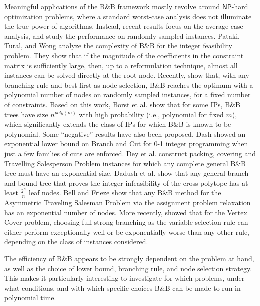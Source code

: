 \documentclass[moor,sglanonrev]{informs4}
\theoremstyle{plain}
\begin{document}
Meaningful applications of the B\&B framework mostly revolve around $\textsf{NP}$-hard optimization problems, where a standard worst-case analysis does not illuminate the true power of algorithms. Instead, recent results focus on the average-case analysis, and study the performance on randomly sampled instances. Pataki, Tural, and Wong \cite{pataki_basis_2010} analyze the complexity of B\&B for the integer feasibility problem. They show that if the magnitude of the coefficients in the constraint matrix is sufficiently large, then, up to a reformulation technique, almost all instances can be solved directly at the root node. Recently, \cite{dey_branch-and-bound_2023} show that, with any branching rule and best-first as node selection, B\&B reaches the optimum with a polynomial number of nodes on randomly sampled instances, for a fixed number of constraints. Based on this work, Borst et al. \cite{Dadush23, Dadush23-2} show that for some IPs, B\&B trees have size $n^{poly(m)}$ with high probability (i.e., polynomial for fixed $m$), which significantly extends the class of IPs for which B\&B is known to be polynomial.
%
Some ``negative'' results have also been proposed. Dash \cite{dash_exponential_2005} showed an exponential lower bound on Branch and Cut for 0-1 integer programming when just a few families of cuts are enforced. Dey et al. \cite{Dey22} construct packing, covering and Travelling Salesperson Problem instances for which any complete general B\&B tree must have an exponential size. Dadush et al. \cite{Dadush20} show that any general branch-and-bound tree that proves the integer infeasibility of the cross-polytope has at least $\frac{2^n}{n}$ leaf nodes. Bell and Frieze \cite{bell_solving_2023} show that any B\&B method for the Asymmetric Traveling Salesman Problem via the assignment problem relaxation has an exponential number of nodes.
%
More recently, \cite{full_strong_branching} showed that for the Vertex Cover problem, choosing full strong branching as the variable selection rule can either perform exceptionally well or be exponentially worse than any other rule, depending on the class of instances considered.

The efficiency of B\&B appears to be strongly dependent on the problem at hand, as well as the choice of lower bound, branching rule, and node selection strategy. This makes it particularly interesting to investigate for which problems, under what conditions, and with which specific choices B\&B can be made to run in polynomial time.

\bigskip
\end{document}
